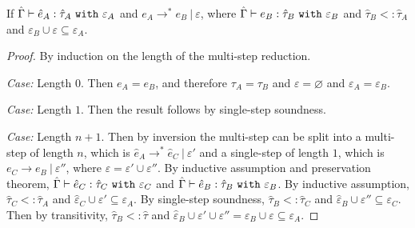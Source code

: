 \begin{appendix}
\hrulefill

\begin{theorem}
If $\hat \Gamma \vdash \hat e_A: \hat \tau_A~\mathtt{with}~ \varepsilon_A$ and $e_A \longrightarrow^{*} e_B~|~\varepsilon$, where $\hat \Gamma \vdash e_B: \hat \tau_B~\mathtt{with}~ \varepsilon_B$ and $\hat \tau_B <: \hat \tau_A$ and $\varepsilon_B \cup \varepsilon \subseteq \varepsilon_A$.
\end{theorem}

\begin{proof} By induction on the length of the multi-step reduction.

\textit{Case:} Length $0$. Then $e_A = e_B$, and therefore $\tau_A = \tau_B$ and $\varepsilon = \varnothing$ and $\varepsilon_A = \varepsilon_B$.

\textit{Case:} Length $1$. Then the result follows by single-step soundness.

\textit{Case:} Length $n+1$. Then by inversion the multi-step can be split into a multi-step of length $n$, which is $\hat e_A \longrightarrow^{*} \hat e_C~|~\varepsilon'$ and a single-step of length $1$, which is $e_C \longrightarrow e_B~|~\varepsilon''$, where $\varepsilon = \varepsilon' \cup \varepsilon''$. By inductive assumption and preservation theorem, $\hat \Gamma \vdash \hat e_C: \hat \tau_C~\mathtt{with}~ \varepsilon_C$ and $\hat \Gamma \vdash \hat e_B: \hat \tau_B~\mathtt{with}~ \varepsilon_B$. By inductive assumption, $\hat \tau_C <: \hat \tau_A$ and $\hat \varepsilon_C \cup \varepsilon' \subseteq \varepsilon_A$. By single-step soundness, $\hat \tau_B <: \hat \tau_C$ and $\hat \varepsilon_B \cup \varepsilon'' \subseteq \varepsilon_C$. Then by transitivity, $\hat \tau_B <: \hat \tau$ and $\hat \varepsilon_B \cup \varepsilon' \cup \varepsilon'' = \varepsilon_B \cup \varepsilon \subseteq \varepsilon_A$.
\end{proof}

\end{appendix}
